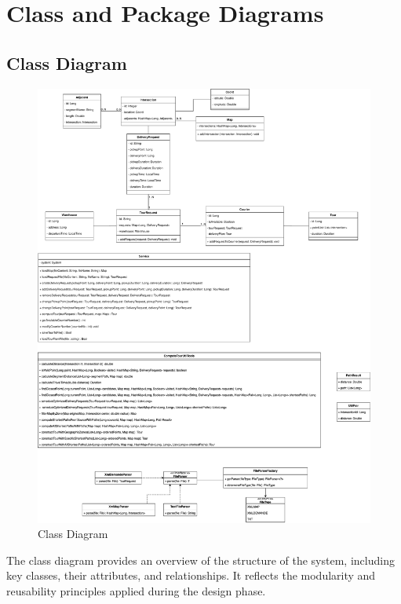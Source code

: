 \documentclass[a4paper]{article}
\begin{document}

\section{Class and Package Diagrams}

\subsection{Class Diagram}
\begin{figure}[H]
    \centering
    \includegraphics[width=\textwidth]{images/class.pdf}
    \caption{Class Diagram}
\end{figure}
The class diagram provides an overview of the structure of the system, including key classes, their attributes, and relationships. It reflects the modularity and reusability principles applied during the design phase.
\end{document}
